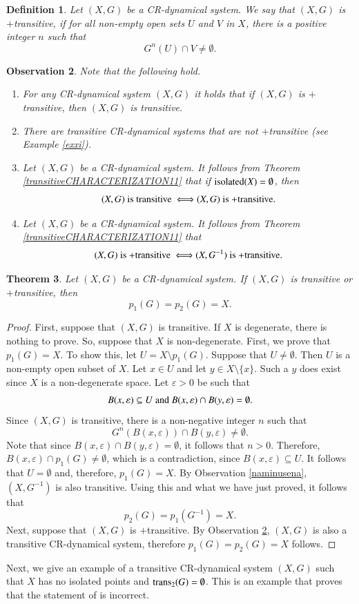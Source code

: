 \documentclass[a4paper,12pt]{article} %
\newcommand{\isolated}{\textup{isolated}}
\newcommand{\trans}{\textup{trans}}
\newtheorem{theorem}{Theorem}[section]
\newtheorem{definition}[theorem]{Definition}
\newtheorem{observation}[theorem]{Observation}
\begin{document}
{
\begin{definition}
Let $(X,G)$ be a CR-dynamical system.  We say that $(X,G)$ is $+$transitive, if for all non-empty open sets $U$ and $V$ in $X$,  there is a positive integer $n$ such that 
$$
G^{n}(U)\cap V\neq \emptyset.
$$
\end{definition}
\begin{observation}\label{mojelilike}
Note that the following hold.
\begin{enumerate}
\item For any CR-dynamical system $(X,G)$ it holds that if $(X,G)$ is  $+$transitive, then $(X,G)$ is transitive.
\item There are transitive CR-dynamical systems that are not $+$transitive (see Example \ref{exxi}).
\item Let $(X,G)$ be a CR-dynamical system. It follows from Theorem \ref{transitiveCHARACTERIZATION11}  that if $\isolated(X)=\emptyset$, then
$$
(X,G) \textup{ is transitive } \Longleftrightarrow  (X,G) \textup{ is } \textup{+transitive.} 
$$ 
\item Let $(X,G)$ be a CR-dynamical system. It follows from Theorem \ref{transitiveCHARACTERIZATION11} that 
$$
(X,G) \textup{ is +transitive } \Longleftrightarrow  (X,G^{-1}) \textup{ is } \textup{+transitive.} 
$$ 
\end{enumerate}
\end{observation}
\begin{theorem}
Let $(X,G)$ be a CR-dynamical system. If $(X,G)$ is transitive or $+$transitive, then 
$$
p_1(G)=p_2(G)=X.
$$
\end{theorem}
\begin{proof}
First, suppose that $(X,G)$ is transitive.  If $X$ is degenerate, there is nothing to prove. So, suppose that $X$ is non-degenerate.  First, we prove that $p_1(G)=X$. To show this, let $U=X\setminus p_1(G)$. Suppose that $U\neq \emptyset$.  Then $U$ is a non-empty open subset of $X$. Let $x\in U$ and let $y\in X\setminus \{x\}$. Such a $y$ does exist since $X$ is a non-degenerate space. Let $\varepsilon >0$ be such that 
$$
B(x,\varepsilon)\subseteq U \textup{ and } B(x,\varepsilon)\cap B(y,\varepsilon)=\emptyset.
$$ 
Since $(X,G)$ is transitive, there is a non-negative integer $n$ such that 
$$
G^n(B(x,\varepsilon))\cap B(y,\varepsilon)\neq \emptyset.
$$
Note that since $B(x,\varepsilon)\cap B(y,\varepsilon)=\emptyset$, it follows that $n>0$.  Therefore, $B(x,\varepsilon)\cap p_1(G)\neq \emptyset$, which is a contradiction, since $B(x,\varepsilon) \subseteq U$. It follows that $U=\emptyset$ and, therefore, $p_1(G)=X$.  By Observation \ref{naminusena}, $(X,G^{-1})$ is also transitive.  Using this and what we have just proved, it follows that 
$$
p_2(G)=p_1(G^{-1})=X.
$$
Next, suppose that $(X,G)$ is $+$transitive.  By Observation \ref{mojelilike}, $(X,G)$ is also a transitive CR-dynamical system, therefore $p_1(G)=p_2(G)=X$ follows.
\end{proof}
}
Next, we give an example of a transitive CR-dynamical system  $(X,G)$ such that $X$ has no isolated points and $\trans_2(G)=\emptyset$.  This is an example that proves that the statement of \cite[Theorem 9, page 3]{SS} is incorrect. 
\end{document}

